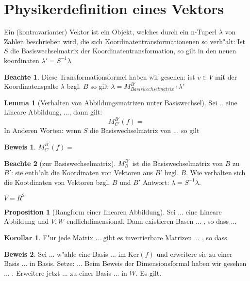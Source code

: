 \documentclass[fontsize=11pt,paper=a4,BCOR=0mm,DIV=11,automark,headsepline]{scrbook}
\theoremstyle{remark}
\theoremstyle{definition}
\newtheorem*{notte}{Beachte}
\newtheorem*{proposition}{Proposition}
\newtheorem{lemma}{Lemma}[section]
\newtheorem*{korollar}{Korollar}
\theoremstyle{proof}
\newtheorem*{prof}{Beweis}
\theoremstyle{remark}
\begin{document}
\section{Physikerdefinition eines Vektors}
\label{sec:phyv}

Ein (kontravarianter) Vektor ist ein Objekt, welches durch ein n-Tuperl \(\lambda\)
von Zahlen beschrieben wird, die sich Koordinatentransformationenen so
verh"alt: Ist $S$ die Basiswechselmatrix der Koordinatentransformation, so gilt
in den neuen koordinaten $\lambda'=S^{-1}\lambda$

\begin{notte}
  Diese Transformationsformel haben wir gesehen: ist $v\in V$ mit der
  Koordinatenspalte $\lambda$ bzgl. $B$ so gilt
  $\lambda=M^{B'}_{Basiswechselmatrix}\cdot \lambda ' $
\end{notte}

\begin{lemma}[Verhalten von Abbildungsmatrizen unter Basiswechsel]
Sei .. eine Lineare Abbildung, ..., dann gilt:
\[
  M^{B'}_{C'}(f)=
\] In Anderen Worten: wenn $S$ die Basiswechselmatrix von ... so gilt
\end{lemma}

\begin{prof}
  $M^{B'}_{C'}(f)=$
\end{prof}

\begin{notte}[zur Basiswechselmatrix]
  $ M^{B'}_{B}$ ist die Basiswechselmatrix von $B$ zu $B'$: sie enth"alt die
  Koordinaten von Vektoren aus $B'$ bzgl. $B$. Wie verhalten sich die
  Kootdinaten von Vektoren bzgl. $B$ und $B'$ Antwort: $\lambda =
  S^{-1}\lambda$.
\end{notte}

\begin{exa}
  $V=R^{2}$
\end{exa}

\begin{proposition}[Rangform einer linearen Abbildung]
  Sei ... eine Lineare Abbildung und $V,W$ endlichdimensional. Dann existieren
  Basen ... , so dass ...
\end{proposition}

\begin{korollar}
  F"ur jede Matrix ... gibt es invertierbare Matrizen ... , so dass
\end{korollar}

\begin{prof}
  Sei ... w"ahle eine Basis ... im $\text{Ker}(f)$  und erweitere sie zu einer
  Basis ... in Basis. Setze: ... Beim Beweis der Dimensionsformal haben wir
  gesehen ... . Erweitere jetzt ... zu einer Basis ... in $W$. Es gilt. 
\end{prof}
\end{document}
